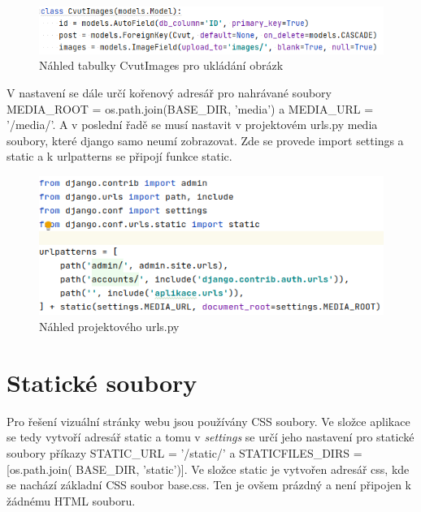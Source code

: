 \begin{figure}[H] \centering
    \includegraphics[width=430pt]{./pictures/9-db-cvutimages.PNG}
    \caption[Náhled tabulky CvutImages pro ukládání obrázků]{Náhled tabulky CvutImages pro ukládání obrázk}
	\label{fig:Náhled tabulky CvutImages pro ukládání obrázk}              
\end{figure}


V nastavení se dále určí kořenový adresář pro nahrávané soubory
MEDIA\_ROOT = os.path.join(BASE\_DIR, 'media') a
MEDIA\_URL = '/media/'.  A v poslední řadě se musí nastavit v
projektovém urls.py media soubory, které django samo neumí
zobrazovat. Zde se provede import settings a static a k urlpatterns se
připojí funkce static.

\begin{figure}[H] \centering
    \includegraphics[width=380pt]{./pictures/10-media-urlspy.PNG}
    \caption[Náhled projektového urls.py]{Náhled projektového urls.py}
	\label{fig:Náhled projektového urls.py}              
\end{figure}

\newpage

\section{Statické soubory}

Pro řešení vizuální stránky webu jsou používány CSS soubory. Ve složce
aplikace se tedy vytvoří adresář static a tomu v \emph{settings} se
určí jeho nastavení pro statické soubory příkazy STATIC\_URL =
  '/static/' a STATICFILES\_DIRS = [os.path.join( BASE\_DIR,
  'static')]. Ve složce static je vytvořen adresář css, kde se
nachází základní CSS soubor base.css. Ten je ovšem prázdný a není
připojen k žádnému HTML souboru.

